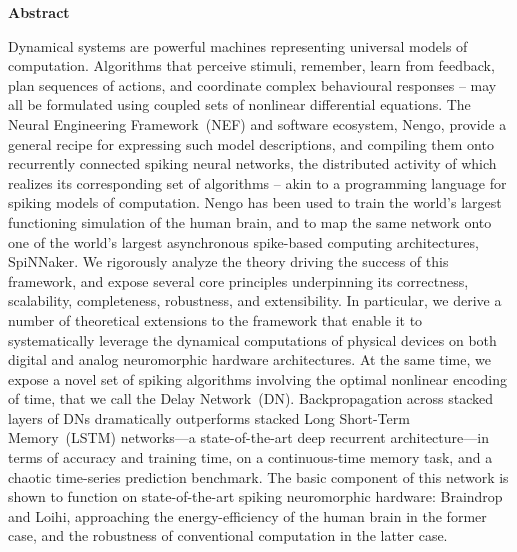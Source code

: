 {}
\begin{center}\textbf{Abstract}\end{center}

Dynamical systems are powerful machines representing universal models of computation.
Algorithms that perceive stimuli, remember, learn from feedback, plan sequences of actions, and coordinate complex behavioural responses -- may all be formulated using coupled sets of nonlinear differential equations.
The Neural Engineering Framework~(NEF) and software ecosystem, Nengo, provide a general recipe for expressing such model descriptions, and compiling them onto recurrently connected spiking neural networks, the distributed activity of which realizes its corresponding set of algorithms -- akin to a programming language for spiking models of computation.
Nengo has been used to train the world's largest functioning simulation of the human brain, and to map the same network onto one of the world's largest asynchronous spike-based computing architectures, SpiNNaker.
We rigorously analyze the theory driving the success of this framework, and expose several core principles underpinning its correctness, scalability, completeness, robustness, and extensibility.
In particular, we derive a number of theoretical extensions to the framework that enable it to systematically leverage the dynamical computations of physical devices on both digital and analog neuromorphic hardware architectures.
At the same time, we expose a novel set of spiking algorithms involving the optimal nonlinear encoding of time, that we call the Delay Network~(DN).
Backpropagation across stacked layers of DNs dramatically outperforms stacked Long Short-Term Memory~(LSTM) networks---a state-of-the-art deep recurrent architecture---in terms of accuracy and training time, on a continuous-time memory task, and a chaotic time-series prediction benchmark.
The basic component of this network is shown to function on state-of-the-art spiking neuromorphic hardware: Braindrop and Loihi, approaching the energy-efficiency of the human brain in the former case, and the robustness of conventional computation in the latter case.

\cleardoublepage
